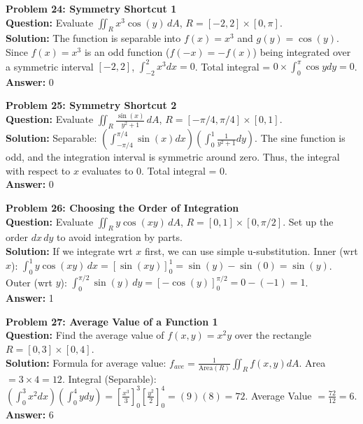 \documentclass[11pt]{article}
\begin{document}
\vspace{0.5cm}
\noindent\textbf{Problem 24: Symmetry Shortcut 1} \\
\textbf{Question:} Evaluate $\iint_R x^3 \cos(y) \, dA$, $R = [-2,2] \times [0,\pi]$. \\
\textbf{Solution:} The function is separable into $f(x) = x^3$ and $g(y) = \cos(y)$.
Since $f(x) = x^3$ is an odd function ($f(-x) = -f(x)$) being integrated over a symmetric interval $[-2,2]$, $\int_{-2}^2 x^3 dx = 0$.
Total integral = $0 \times \int_0^\pi \cos y dy = 0$. \\
\textbf{Answer:} 0

\vspace{0.5cm}
\noindent\textbf{Problem 25: Symmetry Shortcut 2} \\
\textbf{Question:} Evaluate $\iint_R \frac{\sin(x)}{y^2+1} \, dA$, $R = [-\pi/4, \pi/4] \times [0,1]$. \\
\textbf{Solution:} Separable: $\left(\int_{-\pi/4}^{\pi/4} \sin(x) dx\right)\left(\int_0^1 \frac{1}{y^2+1} dy\right)$.
The sine function is odd, and the integration interval is symmetric around zero. Thus, the integral with respect to $x$ evaluates to 0. 
Total integral = 0. \\
\textbf{Answer:} 0

\vspace{0.5cm}
\noindent\textbf{Problem 26: Choosing the Order of Integration} \\
\textbf{Question:} Evaluate $\iint_R y \cos(xy) \, dA$, $R = [0,1] \times [0,\pi/2]$. Set up the order $dx \, dy$ to avoid integration by parts. \\
\textbf{Solution:} If we integrate wrt $x$ first, we can use simple u-substitution.
Inner (wrt $x$): $\int_0^1 y \cos(xy) \, dx = \left[ \sin(xy) \right]_0^1 = \sin(y) - \sin(0) = \sin(y)$.
Outer (wrt $y$): $\int_0^{\pi/2} \sin(y) \, dy = \left[ -\cos(y) \right]_0^{\pi/2} = 0 - (-1) = 1$. \\
\textbf{Answer:} 1

\vspace{0.5cm}
\noindent\textbf{Problem 27: Average Value of a Function 1} \\
\textbf{Question:} Find the average value of $f(x,y) = x^2 y$ over the rectangle $R = [0,3] \times [0,4]$. \\
\textbf{Solution:} Formula for average value: $f_{ave} = \frac{1}{\text{Area}(R)} \iint_R f(x,y) dA$.
Area $= 3 \times 4 = 12$.
Integral (Separable): $\left(\int_0^3 x^2 dx\right)\left(\int_0^4 y dy\right) = \left[\frac{x^3}{3}\right]_0^3 \left[\frac{y^2}{2}\right]_0^4 = (9)(8) = 72$.
Average Value $= \frac{72}{12} = 6$. \\
\textbf{Answer:} 6
\end{document}
